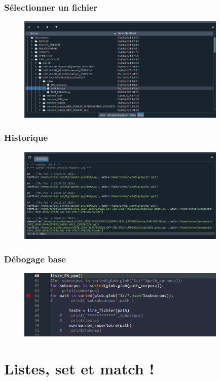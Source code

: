 \begin{frame}
  \frametitle{Sélectionner un fichier}
  \begin{figure}
  \includegraphics[width=10cm]{images/spyder_Files.png}
  \end{figure}
  \end{frame}

\begin{frame}
  \frametitle{Historique}
  \begin{figure}
  \includegraphics[width=10cm]{images/spyder_hystory}
	\end{figure}  
  \end{frame}
  
\begin{frame}
  \frametitle{Débogage base}
  \begin{figure}
  \includegraphics[width=10cm]{images/spyder_signal_erreur.png}
	\end{figure}  
  \end{frame}
  
\section{Listes, set et match !}

